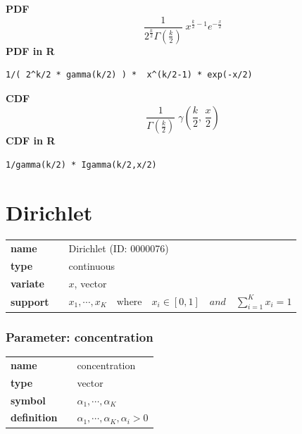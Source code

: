 \smallskip \noindent \hspace{.2cm} \textbf{PDF} 
\begin{equation*}\frac{1}{2^{\frac{k}{2}}\Gamma\left(\frac{k}{2}\right)}\; x^{\frac{k}{2}-1} e^{-\frac{x}{2}}\end{equation*}
\smallskip \noindent \hspace{.2cm} \textbf{PDF in R}  
\begin{verbatim}
1/( 2^k/2 * gamma(k/2) ) *  x^(k/2-1) * exp(-x/2)
\end{verbatim}
\smallskip \noindent \hspace{.2cm} \textbf{CDF} 
\begin{equation*}\frac{1}{\Gamma\left(\frac{k}{2}\right)}\; \gamma\left(\frac{k}{2},\,\frac{x}{2}\right)\end{equation*}
\smallskip \noindent \hspace{.2cm} \textbf{CDF in R}  
\begin{verbatim}
1/gamma(k/2) * Igamma(k/2,x/2)
\end{verbatim}

\smallskip\section*{Dirichlet} 

  \bigskip 

\begin{tabular}{p{2cm}cl}
\textbf{name} & & Dirichlet (ID: 0000076)\\ 
 
\textbf{type} & & continuous \\ 

\textbf{variate} & & $x$, vector \\ 

\textbf{support} & & $x_1, \cdots, x_K \quad\text{where}\quad x_i \in [0,1]\quad and \quad\sum_{i=1}^K x_i = 1$
\end{tabular}
\subsubsection*{Parameter: concentration}

\noindent\begin{tabular}{p{2cm}cl}
\textbf{name} & & concentration \\
\textbf{type} & & vector \\
\textbf{symbol} & & $\alpha_1, \cdots, \alpha_K$  \\
\textbf{definition} & & $\alpha_1, \cdots, \alpha_K, \alpha_i > 0$
\end{tabular}
